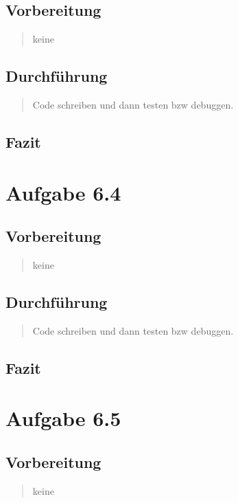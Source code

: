 	\subsection{Vorbereitung}
		\begin{quote}
			keine
		\end{quote}
	\subsection{Durchführung}
		\begin{quote}
			Code schreiben und dann testen bzw debuggen.
		\end{quote}
	\subsection{Fazit}
		\begin{quote}
			
		\end{quote}

\section{Aufgabe 6.4}
\subsection{Vorbereitung}
\begin{quote}
	keine
\end{quote}
\subsection{Durchführung}
\begin{quote}
	Code schreiben und dann testen bzw debuggen.
\end{quote}
\subsection{Fazit}
\begin{quote}
	
\end{quote}

\section{Aufgabe 6.5}
\subsection{Vorbereitung}
\begin{quote}
	keine
\end{quote}
